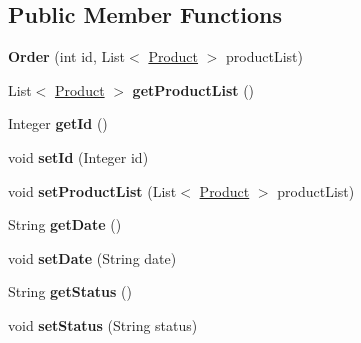 \subsection*{Public Member Functions}
\begin{DoxyCompactItemize}
\item 
\mbox{\label{classmondragon_1_1edu_1_1clases_1_1_order_a41da86d34a65c94cf93e5e54f34a81b9}} 
{\bfseries Order} (int id, List$<$ \mbox{\hyperlink{classmondragon_1_1edu_1_1clases_1_1_product}{Product}} $>$ product\+List)
\item 
\mbox{\label{classmondragon_1_1edu_1_1clases_1_1_order_a89f007add1a8a6a14911e9c5cf07bb05}} 
List$<$ \mbox{\hyperlink{classmondragon_1_1edu_1_1clases_1_1_product}{Product}} $>$ {\bfseries get\+Product\+List} ()
\item 
\mbox{\label{classmondragon_1_1edu_1_1clases_1_1_order_a01feb417b8e65c38a49b320f08ba365a}} 
Integer {\bfseries get\+Id} ()
\item 
\mbox{\label{classmondragon_1_1edu_1_1clases_1_1_order_af8fcff4ed3994d16bf0da4f65958bbea}} 
void {\bfseries set\+Id} (Integer id)
\item 
\mbox{\label{classmondragon_1_1edu_1_1clases_1_1_order_a0ee0371f8287a1671e31e6326307dc30}} 
void {\bfseries set\+Product\+List} (List$<$ \mbox{\hyperlink{classmondragon_1_1edu_1_1clases_1_1_product}{Product}} $>$ product\+List)
\item 
\mbox{\label{classmondragon_1_1edu_1_1clases_1_1_order_abd5b961c7eab6c6895804f8a24c37067}} 
String {\bfseries get\+Date} ()
\item 
\mbox{\label{classmondragon_1_1edu_1_1clases_1_1_order_adc83381083d405b60efa1a009a5f15d9}} 
void {\bfseries set\+Date} (String date)
\item 
\mbox{\label{classmondragon_1_1edu_1_1clases_1_1_order_ab63efb53cba4f0c378ff4ca235616765}} 
String {\bfseries get\+Status} ()
\item 
\mbox{\label{classmondragon_1_1edu_1_1clases_1_1_order_a617e1262879742f28ffbdf0fe07dac3f}} 
void {\bfseries set\+Status} (String status)
\end{DoxyCompactItemize}


